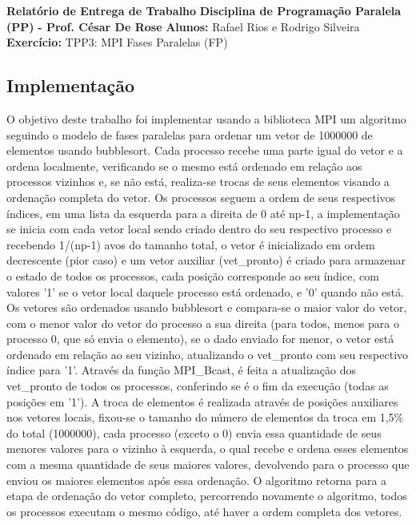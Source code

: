 \documentclass{article}
\begin{document}
\textbf{Relatório de Entrega de Trabalho} \newline
\textbf{Disciplina de Programação Paralela (PP)}\textbf{ - Prof. César De Rose} \newline
\textbf{Alunos:} Rafael Rios e Rodrigo Silveira \newline
\textbf{Exercício:} TPP3: MPI Fases Paralelas (FP)

\begin{multicols*}{2}

\section{Implementação}
O objetivo deste trabalho foi implementar usando a biblioteca MPI um algoritmo seguindo o modelo de fases paralelas para ordenar um vetor de 1000000 de elementos usando bubblesort. Cada processo recebe uma parte igual do vetor e a ordena localmente, verificando se o mesmo está ordenado em relação aos processos vizinhos e, se não está, realiza-se trocas de seus elementos visando a ordenação completa do vetor. Os processos seguem a ordem de seus respectivos índices, em uma lista da esquerda para a direita de 0 até np-1, a implementação se inicia com cada vetor local sendo criado dentro do seu respectivo processo e recebendo 1/(np-1) avos do tamanho total, o vetor é inicializado em ordem decrescente (pior caso) e um vetor auxiliar (vet\_pronto) é criado para armazenar o estado de todos os processos, cada posição corresponde ao seu índice, com valores '1' se o vetor local daquele processo está ordenado, e '0' quando não está. Os vetores são ordenados usando bubblesort e compara-se o maior valor do vetor, com o menor valor do vetor do processo a sua direita (para todos, menos para o processo 0, que só envia o elemento), se o dado enviado for menor, o vetor está ordenado em relação ao seu vizinho, atualizando o vet\_pronto com seu respectivo índice para '1'. Através da função MPI\_Bcast, é feita a atualização dos vet\_pronto de todos os processos, conferindo se é o fim da execução (todas as posições em '1'). A troca de elementos é realizada através de posições auxiliares nos vetores locais, fixou-se o tamanho do número de elementos da troca em 1,5\% do total (1000000), cada processo (exceto o 0) envia essa quantidade de seus menores valores para o vizinho à esquerda, o qual recebe e ordena esses elementos com a mesma quantidade de seus maiores valores, devolvendo para o processo que enviou os maiores elementos após essa ordenação. O algoritmo retorna para a etapa de ordenação do vetor completo, percorrendo novamente o algoritmo, todos os processos executam o mesmo código, até haver a ordem completa dos vetores.

\end{multicols*}
\end{document}
